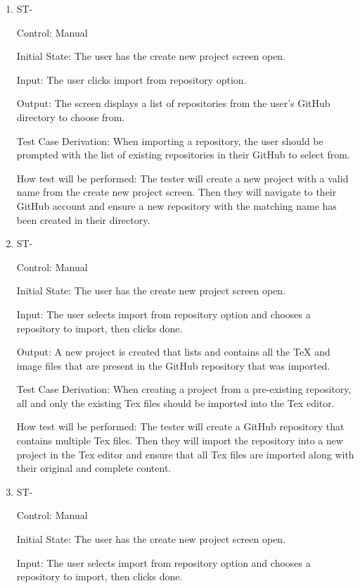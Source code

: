 \documentclass[12pt, titlepage]{article}
\newcounter{TESTID}
\newcommand\TESTNUM{\stepcounter{TESTID}\theTESTID}
\begin{document}
\begin{enumerate}
		\item{ST-\TESTNUM\\}
		
		Control: Manual
		
		Initial State: The user has the create new project screen open.
		
		Input: The user clicks import from repository option.
		
		Output: The screen displays a list of repositories from the user's GitHub directory to choose from.
		
		Test Case Derivation: When importing a repository, the user should be prompted with the list of existing repositories in their GitHub to select from. 
		
		How test will be performed: The tester will create a new project with a valid name from the create new project screen. Then they will navigate to their GitHub account and ensure a new repository with the matching name has been created in their directory.
		
		\item{ST-\TESTNUM\\}
		
		Control: Manual
		
		Initial State: The user has the create new project screen open.
		
		Input: The user selects import from repository option and chooses a repository to import, then clicks done.
		
		Output: A new project is created that lists and contains all the TeX and image files that are present in the GitHub repository that was imported.
		
		Test Case Derivation: When creating a project from a pre-existing repository, all and only the existing Tex files should be imported into the Tex editor.
		
		How test will be performed: The tester will create a GitHub repository that contains multiple Tex files. Then they will import the repository into a new project in the Tex editor and ensure that all Tex files are imported along with their original and complete content.
		
		\item{ST-\TESTNUM\\}
		
		Control: Manual
		
		Initial State: The user has the create new project screen open.
		
		Input: The user selects import from repository option and chooses a repository to import, then clicks done.
		

\end{enumerate}
\end{document}
